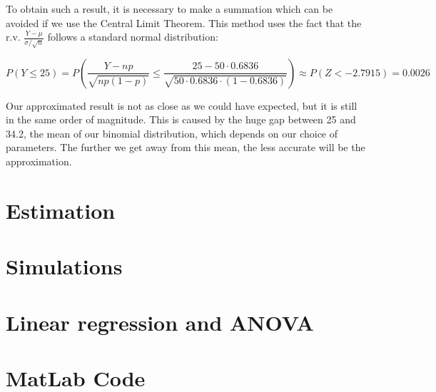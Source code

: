 \documentclass[a4paper]{article}
\begin{document}
\begin{enumerate}[(a)]
To obtain such a result, it is necessary to make a summation which can be avoided if we use the Central Limit Theorem. This method uses the fact that the r.v. $\frac{Y-\mu}{\sigma / \sqrt{n}}$ follows a standard normal distribution:

$$P(Y \leq 25) = P\left ( \frac{Y-np}{\sqrt{np(1-p)}} \leq \frac{25-50\cdot0.6836}{\sqrt{50\cdot0.6836\cdot(1-0.6836)}} \right ) \approx P(Z < -2.7915) = 0.0026$$

Our approximated result is not as close as we could have expected, but it is still in the same order of magnitude. This is caused by the huge gap between 25 and 34.2, the mean of our binomial distribution, which depends on our choice of parameters. The further we get away from this mean, the less accurate will be the approximation.

\end{enumerate}

\section{Estimation}

\section{Simulations}

\section{Linear regression and ANOVA}

\appendix

\section{MatLab Code}
\end{document}
